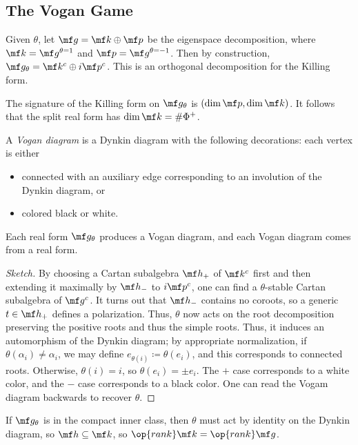 \documentclass{article}
\begin{document}
\subsection{The Vogan Game}
\begin{remark}
	Given $\theta$, let $\mf g=\mf k\oplus\mf p$ be the eigenspace decomposition, where $\mf k=\mf g^{\theta=1}$ and $\mf p=\mf g^{\theta=-1}$. Then by construction, $\mf g_\theta=\mf k^c\oplus i\mf p^c$. This is an orthogonal decomposition for the Killing form.
\end{remark}
\begin{example}
	The signature of the Killing form on $\mf g_\theta$ is $(\dim\mf p,\dim\mf k)$. It follows that the split real form has $\dim\mf k=\#\Phi^+$.
\end{example}
\begin{definition}
	A \textit{Vogan diagram} is a Dynkin diagram with the following decorations: each vertex is either
	\begin{itemize}
		\item connected with an auxiliary edge corresponding to an involution of the Dynkin diagram, or
		\item colored black or white.
	\end{itemize}
\end{definition}
\begin{proposition}
	Each real form $\mf g_\theta$ produces a Vogan diagram, and each Vogan diagram comes from a real form.
\end{proposition}
\begin{proof}[Sketch]
	By choosing a Cartan subalgebra $\mf h_+$ of $\mf k^c$ first and then extending it maximally by $\mf h_-$ to $i\mf p^c$, one can find a $\theta$-stable Cartan subalgebra of $\mf g^c$. It turns out that $\mf h_-$ contains no coroots, so a generic $t\in\mf h_+$ defines a polarization. Thus, $\theta$ now acts on the root decomposition preserving the positive roots and thus the simple roots. Thus, it induces an automorphism of the Dynkin diagram; by appropriate normalization, if $\theta(\alpha_i)\ne\alpha_i$, we may define $e_{\theta(i)}\coloneqq\theta(e_i)$, and this corresponds to connected roots. Otherwise, $\theta(i)=i$, so $\theta(e_i)=\pm e_i$. The $+$ case corresponds to a white color, and the $-$ case corresponds to a black color. One can read the Vogam diagram backwards to recover $\theta$.
\end{proof}
\begin{example}
	If $\mf g_\theta$ is in the compact inner class, then $\theta$ must act by identity on the Dynkin diagram, so $\mf h\subseteq\mf k$, so $\op{rank}\mf k=\op{rank}\mf g$.
\end{example}
\end{document}
